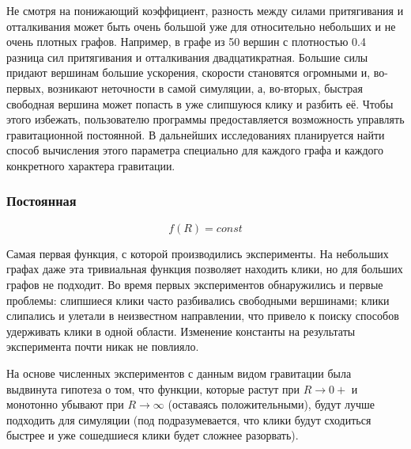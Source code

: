     Не смотря на понижающий коэффициент, разность между силами притягивания и отталкивания
    может быть очень большой уже для относительно небольших и не очень плотных графов.
    Например, в графе из 50 вершин с плотностью 0.4 разница сил притягивания и отталкивания
    двадцатикратная.
    Большие силы придают вершинам большие ускорения, скорости становятся огромными
    и, во-первых, возникают неточности в самой симуляции, а, во-вторых, быстрая
    свободная вершина может попасть в уже слипшуюся клику и разбить её.
    Чтобы этого избежать, пользователю программы предоставляется возможность управлять
    гравитационной постоянной.
    В дальнейших исследованиях планируется найти способ вычисления этого параметра
    специально для каждого графа и каждого конкретного характера гравитации.
    
    \subsubsection{Постоянная}
      \begin{equation}
      \label{gconst_eq}
        f(R) = const
      \end{equation}

      Самая первая функция, с которой производились эксперименты.
      На небольших графах даже эта тривиальная функция позволяет находить клики,
      но для больших графов не подходит.
      Во время первых экспериментов обнаружились и первые проблемы: слипшиеся клики 
      часто разбивались свободными вершинами; клики слипались и улетали в неизвестном
      направлении, что привело к поиску способов удерживать клики в одной области.
      Изменение константы на результаты эксперимента почти никак не повлияло.

      На основе численных экспериментов с данным видом гравитации была выдвинута
      гипотеза о том, что функции, которые растут при $R \rightarrow 0+$ и монотонно убывают при
      $R \rightarrow \infty$ (оставаясь положительными), будут лучше подходить
      для симуляции (под \guillemotright
      подразумевается, что клики будут сходиться быстрее и уже сошедшиеся клики
      будет сложнее разорвать).
